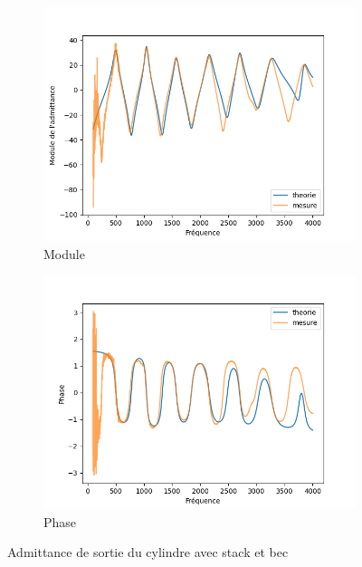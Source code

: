 \documentclass[atiam, article]{rapport} %
\begin{document}
\begin{figure}[H]
  \centering
  \begin{subfigure}[b]{.45\textwidth}
    \centering
    \includegraphics[width=\textwidth]{vents/images_vents/admittance_cylindre+stack+bec_amp.png}
    \caption{Module}
    \label{subfig:admittance_cylindre+stack+bec_amp}
  \end{subfigure}
  \begin{subfigure}[b]{.45\textwidth}
    \centering
    \includegraphics[width=\textwidth]{vents/images_vents/admittance_cylindre+stack+bec_phase.png}
    \caption{Phase}
    \label{subfig:admittance_cylindre+stack+bec_phase}
  \end{subfigure}
  \caption{Admittance de sortie du cylindre avec stack et bec}
  \label{fig:admittance_cyl_stack_bec}
\end{figure}
\end{document}
